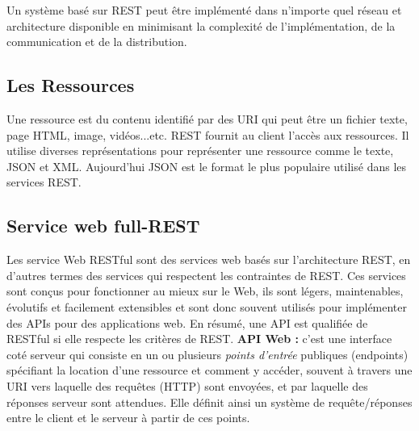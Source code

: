 Un système basé sur REST peut être implémenté dans n'importe quel réseau et architecture disponible en minimisant la complexité de l'implémentation, de la communication et de la distribution.
\subsection{Les Ressources}
Une ressource est du contenu identifié par des URI  qui peut être un fichier texte, page HTML, image, vidéos...etc.
REST fournit au client l'accès aux ressources. Il utilise diverses représentations pour représenter une ressource comme le texte, JSON et XML. Aujourd'hui JSON est le format le plus populaire utilisé dans les services REST.

\subsection{Service web full-REST}
Les service Web RESTful sont des services web basés sur l'architecture REST, en d'autres termes des services qui respectent les contraintes de REST.
Ces services sont conçus pour fonctionner au mieux sur le Web, ils sont légers, maintenables, évolutifs et facilement extensibles et sont donc souvent utilisés pour implémenter des APIs pour des applications web.\cite{refTutorialPointsREST}
\newline 
En résumé, une API est qualifiée de RESTful si elle respecte les critères de REST.
\newline
\newline
\textbf{API Web :} c'est une interface coté serveur qui consiste en un ou plusieurs \emph{points d'entrée} publiques (endpoints) spécifiant la location d'une ressource et comment y accéder, souvent à travers une URI vers laquelle des requêtes (HTTP) sont envoyées, et par laquelle des réponses serveur sont attendues.
Elle définit ainsi un système de requête/réponses entre le client et le serveur à partir de ces points.

\newpage
